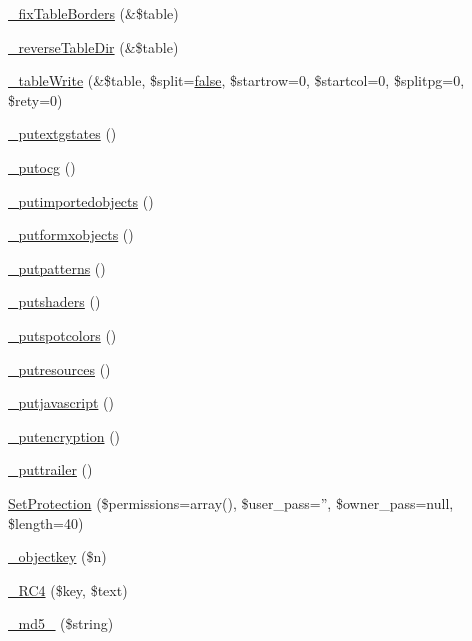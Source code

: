 \begin{DoxyCompactItemize}
\item 
\hyperlink{classm_p_d_f_a18f272afecca6bd5fd5f81ecf78494e6}{\-\_\-fix\-Table\-Borders} (\&\$table)
\item 
\hyperlink{classm_p_d_f_a0e66e2d4ed69a8adf81bab32506dc21e}{\-\_\-reverse\-Table\-Dir} (\&\$table)
\item 
\hyperlink{classm_p_d_f_a6973f0e1a631a31b4969b813936b9ecc}{\-\_\-table\-Write} (\&\$table, \$split=\hyperlink{ttfontsuni_8php_afbaa04e5cc97693dc668b3c45d3dd740}{false}, \$startrow=0, \$startcol=0, \$splitpg=0, \$rety=0)
\item 
\hyperlink{classm_p_d_f_ac5b73079114522c8fa2e06912ae4e08f}{\-\_\-putextgstates} ()
\item 
\hyperlink{classm_p_d_f_a485a0327bf30d3ef13d010a280b69bd4}{\-\_\-putocg} ()
\item 
\hyperlink{classm_p_d_f_ad16a6e6171441d655585e537d098af5a}{\-\_\-putimportedobjects} ()
\item 
\hyperlink{classm_p_d_f_a85fb65d1ee2d46328fdad806f54d9de8}{\-\_\-putformxobjects} ()
\item 
\hyperlink{classm_p_d_f_ae44186281bfd92010d93c126f0a83a52}{\-\_\-putpatterns} ()
\item 
\hyperlink{classm_p_d_f_a997f5c2303dc3f9e0ccc702ad237bedd}{\-\_\-putshaders} ()
\item 
\hyperlink{classm_p_d_f_a753274f9d6afbff3fc2059b9668f7f8e}{\-\_\-putspotcolors} ()
\item 
\hyperlink{classm_p_d_f_af47795725ac90a5e9a8919dc4a0fdf79}{\-\_\-putresources} ()
\item 
\hyperlink{classm_p_d_f_adc4ef31995ae6f7ad4aff43c33500311}{\-\_\-putjavascript} ()
\item 
\hyperlink{classm_p_d_f_a6003e2bc5fe1094b27f591e1765e71f7}{\-\_\-putencryption} ()
\item 
\hyperlink{classm_p_d_f_abf28f0de8aac55e20128956628cf2871}{\-\_\-puttrailer} ()
\item 
\hyperlink{classm_p_d_f_a6a60fce0c5f0a305768c7054abb04803}{Set\-Protection} (\$permissions=array(), \$user\-\_\-pass='', \$owner\-\_\-pass=null, \$length=40)
\item 
\hyperlink{classm_p_d_f_aaaafd725e83fc358341a15d4fccbe059}{\-\_\-objectkey} (\$n)
\item 
\hyperlink{classm_p_d_f_a4c0ad456713f79450c43251474ead9ee}{\-\_\-\-R\-C4} (\$key, \$text)
\item 
\hyperlink{classm_p_d_f_a124551f9a0494595bfc13621b2bcd6de}{\-\_\-md5\-\_} (\$string)
\item 

\end{DoxyCompactItemize}
